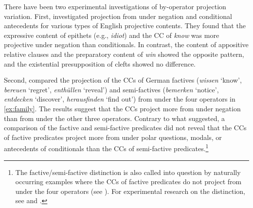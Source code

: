 \documentclass[a4paper,12pt,twoside]{article}
\newcommand{\poscite}[1]{\citeauthor{#1}'s \citeyear{#1}}
\begin{document}
    There have been two experimental investigations of by-operator projection variation. First, \citet{smith_relationship_2014} investigated projection from under negation and conditional antecedents for various types of English projective contents. They found that the expressive content of epithets (e.g., \textit{idiot}) and the CC of \textit{know} was more projective under negation than conditionals. In contrast, the content of appositive relative clauses and the preparatory content of \textit{win} showed the opposite pattern, and the existential presupposition of clefts showed no difference.
    
    Second, \citet{sieker_projective_2022}  compared the projection of the CCs of German factives (\textit{wissen} `know', \textit{bereuen} `regret', \textit{ent\-hüllen} `reveal') and semi-factives (\textit{bemerken} `notice', \textit{entdecken} `discover', \textit{herausfinden} `find out') from under the four operators in \ref{ex:family}. The results suggest that the CCs project more from under negation than from under the other three operators. Contrary to what \citet{karttunen_observations_1971} suggested, a comparison of the factive and semi-factive predicates did not reveal that the CCs of factive predicates project more from under polar questions, modals, or antecedents of conditionals than the CCs of semi-factive predicates.\footnote{The factive/semi-factive distinction is also called into question by naturally occurring examples where the CCs of factive predicates do not project from under the four operators (see \citealt{beaver_have_2010,de_marneffe_did_2012,de_marneffe_commitmentbank_2019}). For experimental research on the distinction, see \citealt{djaerv-etal2016} and \citealt{djarv_cognitive_2018}.
    }

\end{document}
